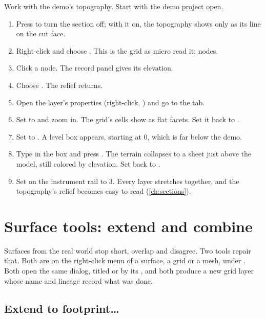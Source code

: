\begin{tryit}
Work with the demo's topography. Start with the demo project open.
\begin{enumerate}
\item Press  to turn the section off; with it on, the topography shows only as its line on the cut face.
\item Right-click  and choose . This is the grid as micro read it: nodes.
\item Click a node. The record panel gives its elevation.
\item Choose . The relief returns.
\item Open the layer's properties (right-click, ) and go to the  tab.
\item Set  to  and zoom in. The grid's cells show as flat facets. Set it back to .
\item Set  to . A level box appears, starting at 0, which is far below the demo.
\item Type  in the box and press . The terrain collapses to a sheet just above the model, still colored by elevation. Set  back to .
\item Set  on the instrument rail to 3. Every layer stretches together, and the topography's relief becomes easy to read (\cref{ch:sections}).
\end{enumerate}
\end{tryit}

\section{Surface tools: extend and combine}\label{sec:grids-tools}

Surfaces from the real world stop short, overlap and disagree. Two tools repair that. Both are on the right-click menu of a surface, a grid or a mesh, under . Both open the same dialog, titled  or  by its , and both produce a new grid layer whose name and lineage record what was done.

\subsection{Extend to footprint…}

